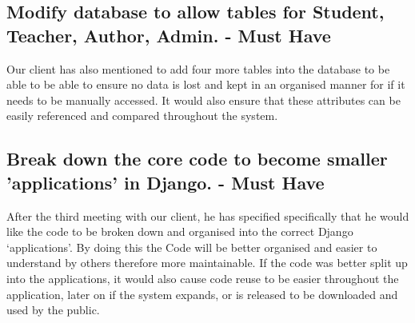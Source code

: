 \documentclass[12pt]{article}
\begin{document}
	\subsection{Modify database to allow tables for Student, Teacher, Author, Admin. - Must Have}
	Our client has also mentioned to add four more tables into the database to be able to be able to ensure no data is lost and kept in an organised manner for if it needs to be manually accessed. It would also ensure that these attributes can be easily referenced and compared throughout the system.
	
	\subsection{Break down the core code to become smaller 'applications' in Django. - Must Have}
	After the third meeting with our client, he has specified specifically that he would like the code to be broken down and organised into the correct Django ‘applications’. By doing this the Code will be better organised and easier to understand by others therefore more maintainable. If the code was better split up into the applications, it would also cause code reuse to be easier throughout the application, later on if the system expands, or is released to be downloaded and used by the public.
\end{document}
